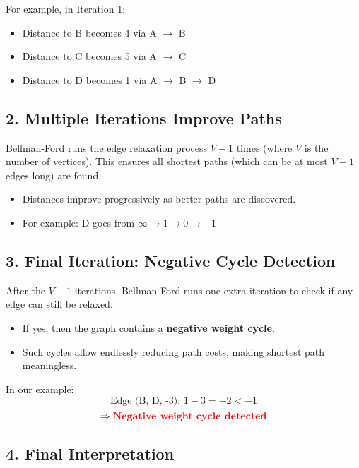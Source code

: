 \documentclass[14pt,a4paper]{extarticle}
\begin{document}
For example, in Iteration 1:
\begin{itemize}
    \item Distance to B becomes 4 via A $\rightarrow$ B
    \item Distance to C becomes 5 via A $\rightarrow$ C
    \item Distance to D becomes 1 via A $\rightarrow$ B $\rightarrow$ D
\end{itemize}

\subsection*{2. Multiple Iterations Improve Paths}

Bellman-Ford runs the edge relaxation process $V-1$ times (where $V$ is the number of vertices). This ensures all shortest paths (which can be at most $V-1$ edges long) are found.

\begin{itemize}
    \item Distances improve progressively as better paths are discovered.
    \item For example: D goes from $\infty \rightarrow 1 \rightarrow 0 \rightarrow -1$
\end{itemize}

\subsection*{3. Final Iteration: Negative Cycle Detection}

After the $V-1$ iterations, Bellman-Ford runs one extra iteration to check if any edge can still be relaxed. 

\begin{itemize}
    \item If yes, then the graph contains a \textbf{negative weight cycle}.
    \item Such cycles allow endlessly reducing path costs, making shortest path meaningless.
\end{itemize}

In our example:
\[
\text{Edge (B, D, -3): } 1 - 3 = -2 < -1
\]
\[
\Rightarrow \textcolor{red}{\textbf{Negative weight cycle detected}}
\]

\subsection*{4. Final Interpretation}
\end{document}
